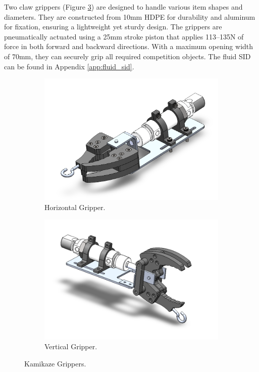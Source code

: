 Two claw grippers (Figure \ref{fig:grippers}) are designed to handle various item shapes and diameters. They are constructed from 10mm HDPE for durability and aluminum for fixation, ensuring a lightweight yet sturdy design. The grippers are pneumatically actuated using a 25mm stroke piston that applies 113–135N of force in both forward and backward directions. With a maximum opening width of 70mm, they can securely grip all required competition objects. The fluid SID can be found in Appendix \ref{app:fluid_sid}.

\begin{figure}[h]
    \centering
    \begin{subfigure}[b]{0.49\columnwidth}
        \includegraphics[width=\textwidth]{Sections/2Design Rationale/images/Horizontal.png}
        \caption{Horizontal Gripper.}
        \label{fig:horizontal_gripper}
    \end{subfigure}
    \hfill
    \begin{subfigure}[b]{0.49\columnwidth}
        \includegraphics[width=\textwidth]{Sections/2Design Rationale/images/Vertical.png}
        \caption{Vertical Gripper.}
        \label{fig:vertical_gripper}
    \end{subfigure}
    \caption{Kamikaze Grippers.}
    \label{fig:grippers}
\end{figure}

